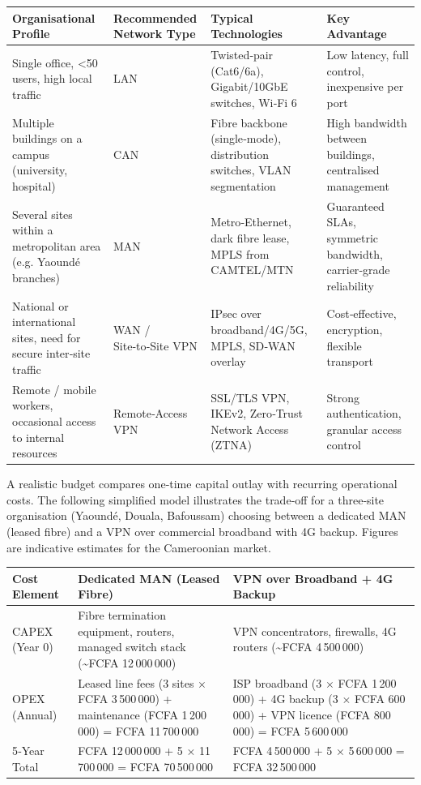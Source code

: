 \documentclass[11pt]{article}
\newcommand{\cle}[1]{{\popxbold\color{popdark}#1}}
\newcounter{popsec}
\newcounter{popsub}
\newcommand{\courssub}[1]{%
  \stepcounter{popsub}%
  \par\vspace{9pt}\noindent{\popxbold\fontsize{11.5}{13}\selectfont\color{popink}{\color{poporange}\thepopsec.\thepopsub}\hspace{6pt}#1}\par\nopagebreak\vspace{4pt}
}
\begin{document}
\begin{center}
\begin{tabularx}{\linewidth}{|l|X|X|X|}
\hline
\rowcolor{popblueL}
\textbf{Organisational Profile} & \textbf{Recommended Network Type} & \textbf{Typical Technologies} & \textbf{Key Advantage} \\
\hline
Single office, \textless 50 users, high local traffic & \cle{LAN} & Twisted‑pair (Cat6/6a), Gigabit/10GbE switches, Wi‑Fi 6 & Low latency, full control, inexpensive per port \\
\hline
Multiple buildings on a campus (university, hospital) & \cle{CAN} & Fibre backbone (single‑mode), distribution switches, VLAN segmentation & High bandwidth between buildings, centralised management \\
\hline
Several sites within a metropolitan area (e.g. Yaoundé branches) & \cle{MAN} & Metro‑Ethernet, dark fibre lease, MPLS from CAMTEL/MTN & Guaranteed SLAs, symmetric bandwidth, carrier‑grade reliability \\
\hline
National or international sites, need for secure inter‑site traffic & \cle{WAN / Site‑to‑Site VPN} & IPsec over broadband/4G/5G, MPLS, SD‑WAN overlay & Cost‑effective, encryption, flexible transport \\
\hline
Remote / mobile workers, occasional access to internal resources & \cle{Remote‑Access VPN} & SSL/TLS VPN, IKEv2, Zero‑Trust Network Access (ZTNA) & Strong authentication, granular access control \\
\hline
\end{tabularx}
\end{center}

\courssub{Cost Analysis: CAPEX vs OPEX}

A realistic budget compares one‑time capital outlay with recurring operational costs. The following simplified model illustrates the trade‑off for a three‑site organisation (Yaoundé, Douala, Bafoussam) choosing between a dedicated MAN (leased fibre) and a VPN over commercial broadband with 4G backup. Figures are indicative estimates for the Cameroonian market.

\begin{center}
\begin{tabularx}{\linewidth}{|l|X|X|}
\hline
\rowcolor{popblueL}
\textbf{Cost Element} & \textbf{Dedicated MAN (Leased Fibre)} & \textbf{VPN over Broadband + 4G Backup} \\
\hline
CAPEX (Year 0) & Fibre termination equipment, routers, managed switch stack (\textasciitilde FCFA 12\,000\,000) & VPN concentrators, firewalls, 4G routers (\textasciitilde FCFA 4\,500\,000) \\
\hline
OPEX (Annual) & Leased line fees (3 sites $\times$ FCFA 3\,500\,000) + maintenance (FCFA 1\,200\,000) = FCFA 11\,700\,000 & ISP broadband (3 $\times$ FCFA 1\,200\,000) + 4G backup (3 $\times$ FCFA 600\,000) + VPN licence (FCFA 800\,000) = FCFA 5\,600\,000 \\
\hline
5‑Year Total & FCFA 12\,000\,000 + 5 $\times$ 11\,700\,000 = FCFA 70\,500\,000 & FCFA 4\,500\,000 + 5 $\times$ 5\,600\,000 = FCFA 32\,500\,000 \\
\hline
\end{tabularx}
\end{center}
\end{document}
